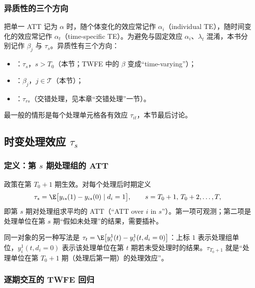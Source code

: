 \subsubsection{异质性的三个方向}

把单一 ATT 记为 $\alpha$ 时，随个体变化的效应常记作 $\alpha_i$（individual TE），随时间变化的效应常记作 $\alpha_t$（time-specific TE）。为避免与固定效应 $\alpha_i$、$\lambda_t$ 混淆，本书分别记作 $\beta_j$ 与 $\tau_s$。异质性有三个方向：
\begin{itemize}
  \item {}：$\tau_s$，$s>T_0$（本节；TWFE 中的 $\beta$ 变成“time-varying”）；
  \item {}：$\beta_j$，$j\in\mathcal T$（本节）；
  \item {}：$\tau_{rs}$（交错处理，见本章“交错处理”一节）。
\end{itemize}
最一般的情形是每个处理单元格各有效应 $\tau_{it}$，本节最后讨论。

\subsection{时变处理效应 \texorpdfstring{$\tau_s$}{tau\_s}}

\subsubsection{定义：第 \texorpdfstring{$s$}{s} 期处理组的 ATT}

\begin{defn}[时变处理效应]\label{def:U15b-tv}
政策在第 $T_0+1$ 期生效。对每个处理后时期定义
\[
\tau_s=\E\bigl[y_{is}(1)-y_{is}(0)\mid d_i=1\bigr],\qquad s=T_0+1,\,T_0+2,\dots,T,
\]
即第 $s$ 期对处理组求平均的 ATT（“ATT over $i$ in $s$”）。第一项可观测；第二项是处理单位在第 $s$ 期“假如未处理”的结果，需要插补。
\end{defn}

同一对象的另一种写法是 $\tau_t=\E\bigl[y_i^1(t)-y_i^1(t,d_i=0)\bigr]$：上标 $1$ 表示处理组单位，$y_i^1(t,d_i=0)$ 表示该处理单位在第 $t$ 期若未受处理时的结果。$\tau_{T_0+1}$ 就是“处理单位在第 $T_0+1$ 期（处理后第一期）的处理效应”。

\subsubsection{逐期交互的 TWFE 回归}

